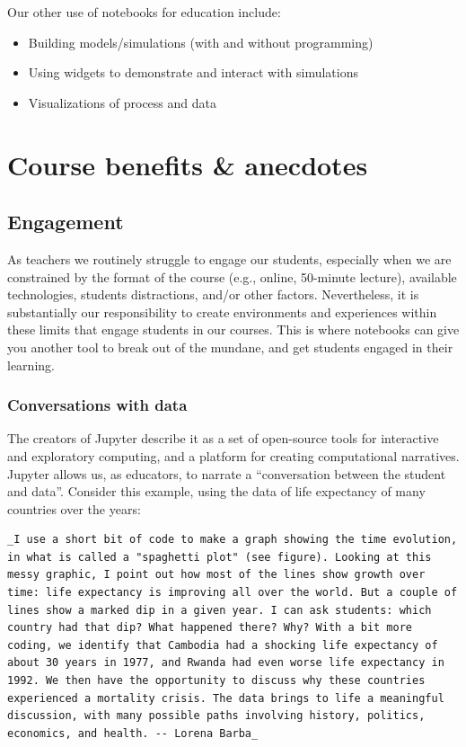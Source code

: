 \documentclass[]{book}
\providecommand{\tightlist}{%
  \setlength{\itemsep}{0pt}\setlength{\parskip}{0pt}}
\begin{document}
Our other use of notebooks for education include:

\begin{itemize}
\tightlist
\item
  Building models/simulations (with and without programming)
\item
  Using widgets to demonstrate and interact with simulations
\item
  Visualizations of process and data
\end{itemize}

\section{Course benefits \& anecdotes}\label{course-benefits-anecdotes}

\subsection{Engagement}\label{engagement}

As teachers we routinely struggle to engage our students, especially
when we are constrained by the format of the course (e.g., online,
50-minute lecture), available technologies, students distractions,
and/or other factors. Nevertheless, it is substantially our
responsibility to create environments and experiences within these
limits that engage students in our courses. This is where notebooks can
give you another tool to break out of the mundane, and get students
engaged in their learning.

\subsubsection{Conversations with data}\label{conversations-with-data}

The creators of Jupyter describe it as a set of open-source tools for
interactive and exploratory computing, and a platform for creating
computational narratives. Jupyter allows us, as educators, to narrate a
``conversation between the student and data''. Consider this example,
using the data of life expectancy of many countries over the years:

\begin{verbatim}
_I use a short bit of code to make a graph showing the time evolution, in what is called a "spaghetti plot" (see figure). Looking at this messy graphic, I point out how most of the lines show growth over time: life expectancy is improving all over the world. But a couple of lines show a marked dip in a given year. I can ask students: which country had that dip? What happened there? Why? With a bit more coding, we identify that Cambodia had a shocking life expectancy of about 30 years in 1977, and Rwanda had even worse life expectancy in 1992. We then have the opportunity to discuss why these countries experienced a mortality crisis. The data brings to life a meaningful discussion, with many possible paths involving history, politics, economics, and health. -- Lorena Barba_
\end{verbatim}
\end{document}
